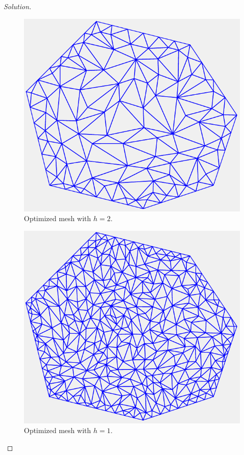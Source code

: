 \documentclass[11pt,a4paper,center,notitlepage]{article}
\numberwithin{equation}{section}
\begin{document}
\begin{proof}[Solution]
\begin{figure}[H]
\centering
\includegraphics[scale=0.9]{mesh_optimize_2}
\caption{Optimized mesh with $h=2$.}
\end{figure}

\begin{figure}[H]
\centering
\includegraphics[scale=0.9]{mesh_optimize_1}
\caption{Optimized mesh with $h=1$.}
\end{figure}


\end{proof}
\end{document}
